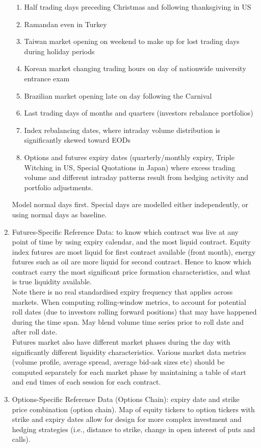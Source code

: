 \begin{definition}
\begin{enumerate}[label=\roman*.]
\begin{enumerate}[label=\arabic*.]
\setlength{\itemsep}{0pt}
\item Half trading days preceding Christmas and following thanksgiving in US
\item Ramandan even in Turkey
\item Taiwan market opening on weekend to make up for lost trading days during holiday periods
\item Korean market changing trading hours on day of nationwide university entrance exam
\item Brazilian market opening late on day following the Carnival
\item Last trading days of months and quarters (investors rebalance portfolios)
\item Index rebalancing dates, where intraday volume distribution is significantly skewed toward EODs
\item Options and futures expiry dates (quarterly/monthly expiry, Triple Witching in US, Special Quotations in Japan) where excess trading volume and different intraday patterns result from hedging activity and portfolio adjustments.
\end{enumerate}
Model normal days first. Special days are modelled either independently, or using normal days as baseline.
\item Futures-Specific Reference Data: to know which contract was live at any point of time by using expiry calendar, and the most liquid contract. Equity index futures are most liquid for first contract available (front month), energy futures such as oil are more liquid for second contract. Hence to know which contract carry the most significant price formation characteristics, and what is true liquidity available.\\
Note there is no real standardised expiry frequency that applies across markets. When computing rolling-window metrics, to account for potential roll dates (due to investors rolling forward positions) that may have happened during the time span. May blend volume time series prior to roll date and after roll date.\\
Futures market also have different market phases during the day with significantly different liquidity characteristics. Various market data metrics (volume profile, average spread, average bid-ask sizes etc) should be computed separately for each market phase by maintaining a table of start and end times of each session for each contract.
\item Options-Specific Reference Data (Options Chain): expiry date and strike price combination (option chain). Map of equity tickers to option tickers with strike and expiry dates allow for design for more complex investment and hedging strategies (i.e., distance to strike, change in open interest of puts and calls).

\end{enumerate}
\end{definition}

